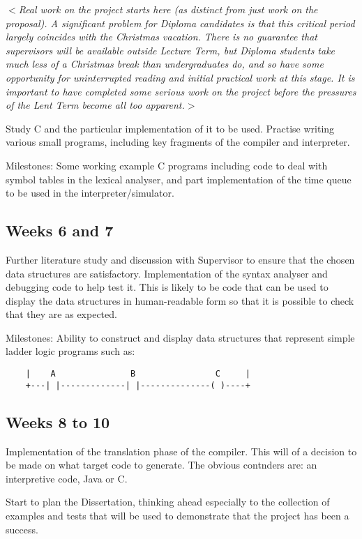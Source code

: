 \documentclass[12pt]{article}
\newcommand{\al}{$<$}
\newcommand{\ar}{$>$}
\begin{document}
\al\emph{Real work on the project starts here (as distinct from just
  work on the proposal).  A significant problem for Diploma candidates
  is that this critical period largely coincides with the Christmas
  vacation.  There is no guarantee that supervisors will be available
  outside Lecture Term, but Diploma students take much less of a
  Christmas break than undergraduates do, and so have some opportunity
  for uninterrupted reading and initial practical work at this stage.
  It is important to have completed some serious work on the project
  before the pressures of the Lent Term become all too apparent.}\ar

Study C and the particular implementation of it to be used.  Practise
writing various small programs, including key fragments of the compiler
and interpreter.

Milestones: Some working example C programs including code to deal
with symbol tables in the lexical analyser, and part implementation of
the time queue to be used in the interpreter/simulator.


\subsection*{Weeks 6 and 7}

Further literature study and discussion with Supervisor to ensure that
the chosen data structures are satisfactory.  Implementation of the
syntax analyser and debugging code to help test it.  This is likely to
be code that can be used to display the data structures in
human-readable form so that it is possible to check that they are as
expected.

Milestones: Ability to construct and display data structures that
represent simple ladder logic programs such as:

\begin{verbatim}
    |    A               B                C     |
    +---| |-------------| |--------------( )----+
\end{verbatim}


\subsection*{Weeks 8 to 10}

Implementation of the translation phase of the compiler. This will of
a decision to be made on what target code to generate. The obvious contnders
are: an interpretive code, Java or C.

Start to plan the Dissertation, thinking ahead especially to the
collection of examples and tests that will be used to demonstrate that
the project has been a success. 
\end{document}
